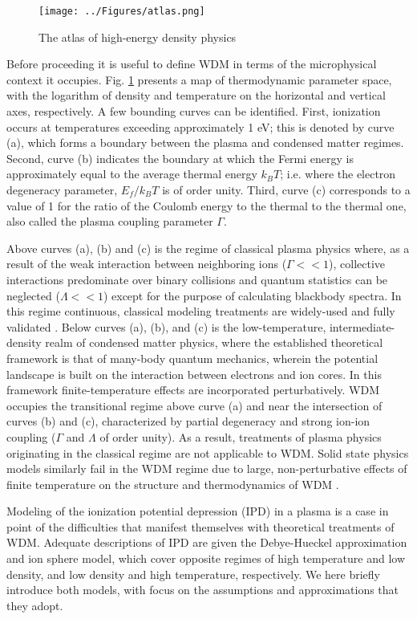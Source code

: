 \documentclass [11pt, proquest, article] {uwthesis}[2016/11/22]
\begin{document}
\begin{figure}[h] 
\caption{The atlas of high-energy density physics}%
\label{fig:atlas}
\centering
\texttt{[image: ../Figures/atlas.png]}
\end{figure}

Before proceeding it is useful to define WDM in terms of the microphysical context it occupies. Fig. \ref{fig:atlas} presents a map of thermodynamic parameter space, with the logarithm of density and temperature on the horizontal and vertical axes, respectively. A few bounding curves can be identified. First, ionization occurs at temperatures exceeding approximately 1 eV; this is denoted by curve (a), which forms a boundary between the plasma and condensed matter regimes. Second, curve (b) indicates the boundary at which the Fermi energy is approximately equal to the average thermal energy $k_BT$; i.e. where the electron degeneracy parameter, $E_f/k_B T$ is of order unity. Third, curve (c) corresponds to a value of 1 for the ratio of the Coulomb energy to the thermal to the thermal one, also called the plasma coupling parameter  $\Gamma$. 

Above curves (a), (b) and (c) is the regime of classical plasma physics where, as a result of the weak interaction between neighboring ions ($\Gamma << 1$), collective interactions predominate over binary collisions and quantum statistics can be neglected ($\Lambda << 1$) except for the purpose of calculating blackbody spectra. In this regime continuous, classical modeling treatments are widely-used and fully validated \cite{krall1973principles}. Below curves (a), (b), and (c) is the low-temperature, intermediate-density realm of condensed matter physics, where the established theoretical framework is that of many-body quantum mechanics, wherein the potential landscape is built on the interaction between electrons and ion cores. In this framework finite-temperature effects are incorporated perturbatively. WDM occupies the transitional regime above curve (a) and near the intersection of curves (b) and (c), characterized by partial degeneracy and strong ion-ion coupling ($\Gamma$ and $\Lambda$ of order unity). As a result, treatments of plasma physics originating in the classical regime are not applicable to WDM. Solid state physics models similarly fail in the WDM regime due to large, non-perturbative effects of finite temperature on the structure and thermodynamics of WDM \cite{mattern2013condensed}.  

Modeling of the ionization potential depression (IPD) in a plasma is a case in point of the difficulties that manifest themselves with theoretical treatments of WDM. Adequate descriptions of IPD are given the Debye-Hueckel approximation and ion sphere model, which cover opposite regimes of high temperature and low density, and low density and high temperature, respectively. We here briefly introduce both models, with focus on the assumptions and approximations that they adopt.
\end{document}
